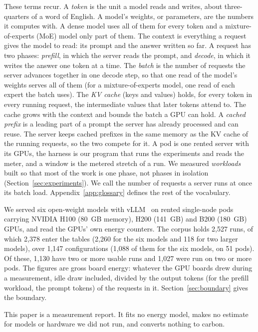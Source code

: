 \documentclass[11pt]{article}
\begin{document}
These terms recur. A \emph{token} is the unit a model reads and writes, about three-quarters of a word of English. A model's weights, or parameters, are the numbers it computes with. A dense model uses all of them for every token and a mixture-of-experts (MoE) model only part of them. The context is everything a request gives the model to read: its prompt and the answer written so far. A request has two phases: \emph{prefill}, in which the server reads the prompt, and \emph{decode}, in which it writes the answer one token at a time. The \emph{batch} is the number of requests the server advances together in one decode step, so that one read of the model's weights serves all of them (for a mixture-of-experts model, one read of each expert the batch uses). The \emph{KV cache} (keys and values) holds, for every token in every running request, the intermediate values that later tokens attend to. The cache grows with the context and bounds the batch a GPU can hold. A \emph{cached prefix} is a leading part of a prompt the server has already processed and can reuse. The server keeps cached prefixes in the same memory as the KV cache of the running requests, so the two compete for it. A pod is one rented server with its GPUs, the harness is our program that runs the experiments and reads the meter, and a window is the metered stretch of a run. We measured \emph{workloads} built so that most of the work is one phase, not phases in isolation (Section~\ref{sec:experiments}). We call the number of requests a server runs at once its batch load. Appendix~\ref{app:glossary} defines the rest of the vocabulary.

We served six open-weight models with vLLM~\citep{kwon2023vllm,vllm0151} on rented single-node pods carrying NVIDIA H100 (80~GB memory), H200 (141~GB) and B200 (180~GB) GPUs, and read the GPUs' own energy counters. The corpus holds 2,527 runs, of which 2,378 enter the tables (2,260 for the six models and 118 for two larger models), over 1,147 configurations (1,088 of them for the six models, on 51 pods). Of these, 1,130 have two or more usable runs and 1,027 were run on two or more pods. The figures are gross board energy: whatever the GPU boards drew during a measurement, idle draw included, divided by the output tokens (for the prefill workload, the prompt tokens) of the requests in it. Section~\ref{sec:boundary} gives the boundary.

This paper is a measurement report. It fits no energy model, makes no estimate for models or hardware we did not run, and converts nothing to carbon.
\end{document}

